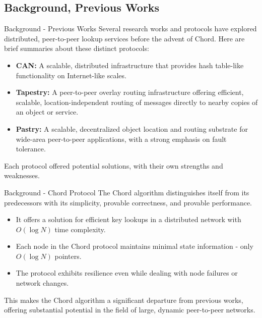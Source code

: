 \documentclass[11pt]{beamer}              %
\begin{document}
\subsection{Background, Previous Works}

\begin{frame}{Background - Previous Works}
Several research works and protocols have explored distributed, peer-to-peer lookup services before the advent of Chord. Here are brief summaries about these distinct protocols:

\begin{itemize}
    \item \textbf{CAN:} A scalable, distributed infrastructure that provides hash table-like functionality on Internet-like scales.
    \item \textbf{Tapestry:} A peer-to-peer overlay routing infrastructure offering efficient, scalable, location-independent routing of messages directly to nearby copies of an object or service.
    \item \textbf{Pastry:} A scalable, decentralized object location and routing substrate for wide-area peer-to-peer applications, with a strong emphasis on fault tolerance.
\end{itemize}

Each protocol offered potential solutions, with their own strengths and weaknesses.
\end{frame}

\begin{frame}{Background - Chord Protocol}
The Chord algorithm distinguishes itself from its predecessors with its simplicity, provable correctness, and provable performance. 

\begin{itemize}
    \item It offers a solution for efficient key lookups in a distributed network with $O(\log N)$ time complexity.
    \item Each node in the Chord protocol maintains minimal state information - only $O(\log N)$ pointers. 
    \item The protocol exhibits resilience even while dealing with node failures or network changes.
\end{itemize}

This makes the Chord algorithm a significant departure from previous works, offering substantial potential in the field of large, dynamic peer-to-peer networks.
\end{frame}
\end{document}
